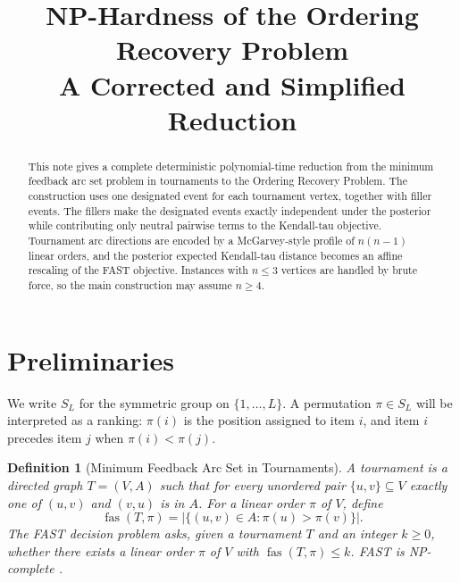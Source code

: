 \documentclass[11pt]{article}
\title{NP-Hardness of the Ordering Recovery Problem\\
\large A Corrected and Simplified Reduction}
\author{}
\date{}
\newtheorem{definition}{Definition}
\newcommand{\fas}{\operatorname{fas}}
\begin{document}
\maketitle

\begin{abstract}
This note gives a complete deterministic polynomial-time reduction from the minimum feedback arc set problem in tournaments to the Ordering Recovery Problem.  The construction uses one designated event for each tournament vertex, together with filler events.  The fillers make the designated events exactly independent under the posterior while contributing only neutral pairwise terms to the Kendall-tau objective.  Tournament arc directions are encoded by a McGarvey-style profile of $n(n-1)$ linear orders, and the posterior expected Kendall-tau distance becomes an affine rescaling of the FAST objective.  Instances with $n\le 3$ vertices are handled by brute force, so the main construction may assume $n\ge 4$.
\end{abstract}

\section{Preliminaries}

We write $S_L$ for the symmetric group on $\{1,\ldots,L\}$.  A permutation $\pi \in S_L$ will be interpreted as a ranking: $\pi(i)$ is the position assigned to item $i$, and item $i$ precedes item $j$ when $\pi(i)<\pi(j)$.

\begin{definition}[Minimum Feedback Arc Set in Tournaments]
A tournament is a directed graph $T=(V,A)$ such that for every unordered pair $\{u,v\}\subseteq V$ exactly one of $(u,v)$ and $(v,u)$ is in $A$.  For a linear order $\pi$ of $V$, define
\begin{equation}
  \fas(T,\pi)=\left|\{(u,v)\in A: \pi(u)>\pi(v)\}\right| .
\end{equation}
The FAST decision problem asks, given a tournament $T$ and an integer $k\ge 0$, whether there exists a linear order $\pi$ of $V$ with $\fas(T,\pi)\le k$.  FAST is NP-complete \cite{Alon2006,Charbit2007}.
\end{definition}
\end{document}
